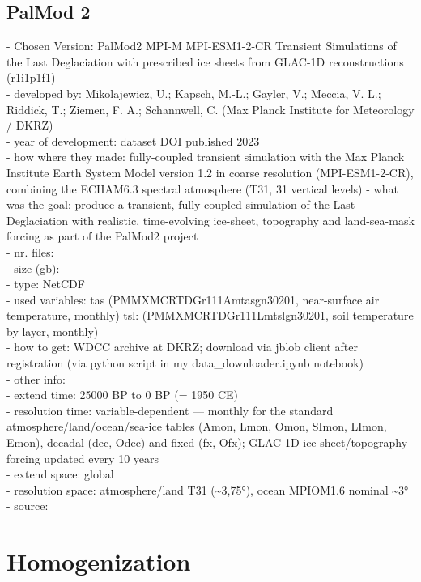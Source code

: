 \documentclass[12pt]{scrartcl}
\begin{document}
\subsection{PalMod 2}
- Chosen Version: PalMod2 MPI-M MPI-ESM1-2-CR Transient Simulations of the Last Deglaciation with prescribed ice sheets from GLAC-1D reconstructions (r1i1p1f1)\\
- developed by: Mikolajewicz, U.; Kapsch, M.-L.; Gayler, V.; Meccia, V. L.; Riddick, T.; Ziemen, F. A.; Schannwell, C. (Max Planck Institute for Meteorology / DKRZ)\\
- year of development: dataset DOI published 2023\\
- how where they made: fully-coupled transient simulation with the Max Planck Institute Earth System Model version 1.2 in coarse resolution (MPI-ESM1-2-CR), combining the ECHAM6.3 spectral atmosphere (T31, 31 vertical levels)
- what was the goal: produce a transient, fully-coupled simulation of the Last Deglaciation with realistic, time-evolving ice-sheet, topography and land-sea-mask forcing as part of the PalMod2 project\\
- nr. files: \\
- size (gb): \\
- type: NetCDF\\
- used variables: tas (PMMXMCRTDGr111Amtasgn30201, near-surface air temperature, monthly)
tsl: (PMMXMCRTDGr111Lmtslgn30201, soil temperature by layer, monthly) \\
- how to get: WDCC archive at DKRZ; download via jblob client after registration \cite{wdcc_jblob} (via python script in my data\_downloader.ipynb notebook)\\
- other info: \\
- extend time: 25000 BP to 0 BP (= 1950 CE)\\
- resolution time: variable-dependent --- monthly for the standard atmosphere/land/ocean/sea-ice tables (Amon, Lmon, Omon, SImon, LImon, Emon), decadal (dec, Odec) and fixed (fx, Ofx); GLAC-1D ice-sheet/topography forcing updated every 10 years\\
- extend space: global\\
- resolution space: atmosphere/land T31 (\textasciitilde3,75°), ocean MPIOM1.6 nominal \textasciitilde3°\\
- source: \cite{palmod2_data}\\


\section{Homogenization}
\end{document}
